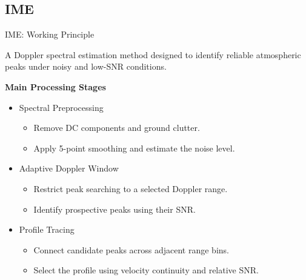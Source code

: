 \documentclass[10.5pt]{beamer}
\begin{document}
\subsection{IME}
\begin{frame}{IME: Working Principle}
\begin{block}{}
A Doppler spectral estimation method designed to identify
reliable atmospheric peaks under noisy and low-SNR conditions.
\end{block}

\vspace{0.15cm}
\textbf{Main Processing Stages}
\begin{itemize}
    \item {Spectral Preprocessing}
    \begin{itemize}
        \item Remove DC components and ground clutter.
        \item Apply 5-point smoothing and estimate the noise level.
    \end{itemize}

    \vspace{0.15cm}

    \item {Adaptive Doppler Window}
    \begin{itemize}
        \item Restrict peak searching to a selected Doppler range.
        \item Identify prospective peaks using their SNR.
    \end{itemize}

    \vspace{0.15cm}

    \item {Profile Tracing}
    \begin{itemize}
        \item Connect candidate peaks across adjacent range bins.
        \item Select the profile using velocity continuity and relative SNR.
    \end{itemize}
\end{itemize}

\vspace{0.1cm}

\end{frame}
\end{document}
